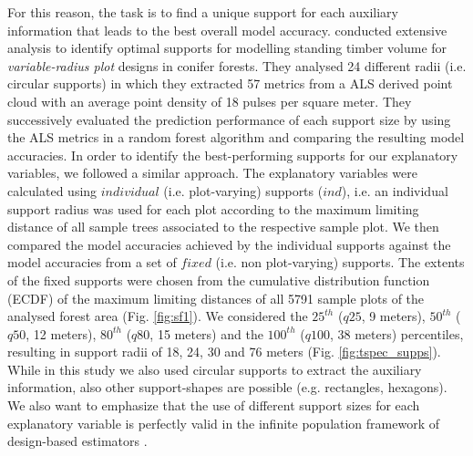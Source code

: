 For this reason, the task is to find a unique support for each auxiliary information that leads to the best overall model accuracy. \citet{deo2016} conducted extensive analysis to identify optimal supports for modelling standing timber volume for \textit{variable-radius plot} designs in conifer forests. They analysed 24 different radii (i.e. circular supports) in which they extracted 57 metrics from a ALS derived point cloud with an average point density of 18 pulses per square meter. They successively evaluated the prediction performance of each support size by using the ALS metrics in a random forest algorithm and comparing the resulting model accuracies. In order to identify the best-performing supports for our explanatory variables, we followed a similar approach. The explanatory variables were calculated using $individual$ (i.e. plot-varying) supports ($ind$), i.e. an individual support radius was used for each plot according to the maximum limiting distance of all sample trees associated to the respective sample plot. We then compared the model accuracies achieved by the individual supports against the model accuracies from a set of $fixed$ (i.e. non plot-varying) supports. The extents of the fixed supports were chosen from the cumulative distribution function (ECDF) of the maximum limiting distances of all 5791 sample plots of the analysed forest area (Fig. \ref{fig:sf1}). We considered the $25^{th}$ ($q25$, 9 meters), $50^{th}$ ($q50$, 12 meters), $80^{th}$ ($q80$, 15 meters) and the $100^{th}$ ($q100$, 38 meters) percentiles, resulting in support radii of 18, 24, 30 and 76 meters (Fig. \ref{fig:tspec_supps}). While in this study we also used circular supports to extract the auxiliary information, also other support-shapes are possible (e.g. rectangles, hexagons). We also want to emphasize that the use of different support sizes for each explanatory variable is perfectly valid in the infinite population framework of design-based estimators \citep{mandallaz2013c, mandallaz2013a}.

